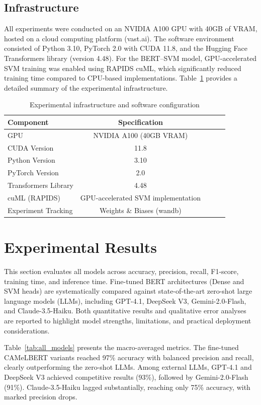 \documentclass[preprint,12pt,authoryear]{elsarticle}
\begin{document}
\subsection{Infrastructure}
All experiments were conducted on an NVIDIA A100 GPU with 40GB of VRAM, hosted on a cloud computing platform (vast.ai). The software environment consisted of Python 3.10, PyTorch 2.0 with CUDA 11.8, and the Hugging Face Transformers library (version 4.48). For the BERT–SVM model, GPU-accelerated SVM training was enabled using RAPIDS cuML, which significantly reduced training time compared to CPU-based implementations. Table~\ref{tab:infrastructure} provides a detailed summary of the experimental infrastructure.

\begin{table}[!ht]
\centering
\caption{Experimental infrastructure and software configuration}
\label{tab:infrastructure}
\small
\begin{tabular}{lcccc}
\hline
\textbf{Component} & \textbf{Specification} \\
\hline
GPU & NVIDIA A100 (40GB VRAM) \\
CUDA Version & 11.8 \\
Python Version & 3.10 \\
PyTorch Version & 2.0 \\
Transformers Library & 4.48 \\
cuML (RAPIDS) & GPU-accelerated SVM implementation \\
Experiment Tracking & Weights \& Biases (wandb) \\
\hline
\end{tabular}
\end{table}

\section{Experimental Results}
\label{results}

This section evaluates all models across accuracy, precision, recall, F1-score, training time, and inference time. Fine-tuned BERT architectures (Dense and SVM heads) are systematically compared against state-of-the-art zero-shot large language models (LLMs), including GPT-4.1, DeepSeek V3, Gemini-2.0-Flash, and Claude-3.5-Haiku. Both quantitative results and qualitative error analyses are reported to highlight model strengths, limitations, and practical deployment considerations.

Table~\ref{tab:all_models} presents the macro-averaged metrics. The fine-tuned CAMeLBERT variants reached 97\% accuracy with balanced precision and recall, clearly outperforming the zero-shot LLMs. Among external LLMs, GPT-4.1 and DeepSeek V3 achieved competitive results (93\%), followed by Gemini-2.0-Flash (91\%). Claude-3.5-Haiku lagged substantially, reaching only 75\% accuracy, with marked precision drops.
\end{document}
